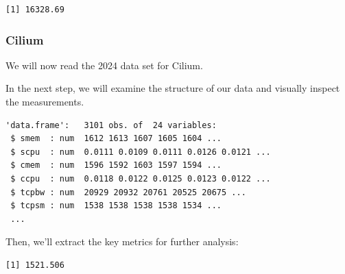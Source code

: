\begin{verbatim}
[1] 16328.69
\end{verbatim}

\subsubsection{Cilium}

We will now read the 2024 data set for Cilium.

\begin{Shaded}
\begin{Highlighting}[]
\OtherTok{\textless{}{-}} 
\OtherTok{\textless{}{-}} \NormalTok{(}\NormalTok{,}\NormalTok{))}
\end{Highlighting}
\end{Shaded}

In the next step, we will examine the structure of our data and visually
inspect the measurements.

\begin{Shaded}
\begin{Highlighting}[]
\end{Highlighting}
\end{Shaded}

\begin{verbatim}
'data.frame':   3101 obs. of  24 variables:
 $ smem  : num  1612 1613 1607 1605 1604 ...
 $ scpu  : num  0.0111 0.0109 0.0111 0.0126 0.0121 ...
 $ cmem  : num  1596 1592 1603 1597 1594 ...
 $ ccpu  : num  0.0118 0.0122 0.0125 0.0123 0.0122 ...
 $ tcpbw : num  20929 20932 20761 20525 20675 ...
 $ tcpsm : num  1538 1538 1538 1538 1534 ...
 ...
\end{verbatim}

Then, we'll extract the key metrics for further analysis:

\begin{Shaded}
\begin{Highlighting}[]
\SpecialCharTok{\$}
\end{Highlighting}
\end{Shaded}

\begin{verbatim}
[1] 1521.506
\end{verbatim}

\begin{Shaded}
\begin{Highlighting}[]
\SpecialCharTok{\$}
\end{Highlighting}
\end{Shaded}

